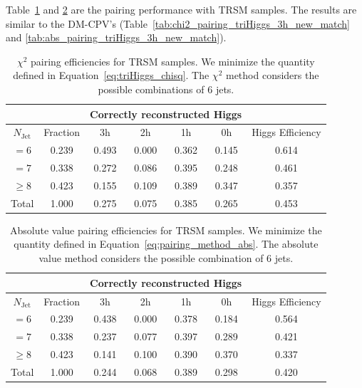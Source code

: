 \documentclass[12pt]{article}
\begin{document}
    Table~\ref{tab:chi2_pairing_triHiggs_3h_trsm} and \ref{tab:abs_pairing_triHiggs_3h_trsm} are the pairing performance with TRSM samples. The results are similar to the DM-CPV's (Table~\ref{tab:chi2_pairing_triHiggs_3h_new_match} and \ref{tab:abs_pairing_triHiggs_3h_new_match}).
    \begin{table}[htpb]
        \centering
        \caption{$\chi^2$ pairing efficiencies for TRSM samples. We minimize the quantity defined in Equation~\ref{eq:triHiggs_chisq}. The $\chi^2$ method considers the possible combinations of 6 jets.}
        \label{tab:chi2_pairing_triHiggs_3h_trsm}
        \begin{tabular}{c|c|cccc|c}
        \multicolumn{1}{l|}{} &          & \multicolumn{4}{c|}{Correctly reconstructed Higgs} & \multicolumn{1}{l}{} \\ \hline
        $N_\text{Jet}$        & Fraction & 3h          & 2h         & 1h         & 0h         & Higgs Efficiency     \\ \hline
        $=6$                  & 0.239 & 0.493 & 0.000 & 0.362 & 0.145 & 0.614 \\
        $=7$                  & 0.338 & 0.272 & 0.086 & 0.395 & 0.248 & 0.461 \\
        $\ge 8$               & 0.423 & 0.155 & 0.109 & 0.389 & 0.347 & 0.357 \\ \hline
        Total                 & 1.000 & 0.275 & 0.075 & 0.385 & 0.265 & 0.453
        \end{tabular}
    \end{table}
    \begin{table}[htpb]
        \centering
        \caption{Absolute value pairing efficiencies for TRSM samples. We minimize the quantity defined in Equation~\ref{eq:pairing_method_abs}. The absolute value method considers the possible combination of 6 jets.}
        \label{tab:abs_pairing_triHiggs_3h_trsm}
        \begin{tabular}{c|c|cccc|c}
        \multicolumn{1}{l|}{} &          & \multicolumn{4}{c|}{Correctly reconstructed Higgs} & \multicolumn{1}{l}{} \\ \hline
        $N_\text{Jet}$        & Fraction & 3h          & 2h         & 1h         & 0h         & Higgs Efficiency     \\ \hline
        $=6$                  & 0.239 & 0.438 & 0.000 & 0.378 & 0.184 & 0.564 \\
        $=7$                  & 0.338 & 0.237 & 0.077 & 0.397 & 0.289 & 0.421 \\
        $\ge 8$               & 0.423 & 0.141 & 0.100 & 0.390 & 0.370 & 0.337 \\ \hline
        Total                 & 1.000 & 0.244 & 0.068 & 0.389 & 0.298 & 0.420
        \end{tabular}
    \end{table}


\end{document}
